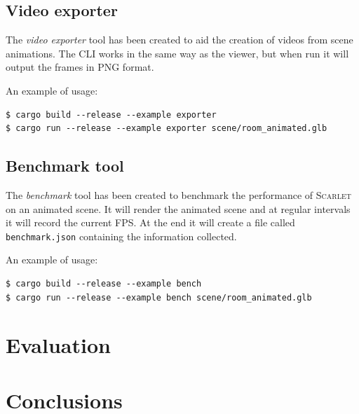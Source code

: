 \documentclass[11pt,a4paper]{report}
\begin{document}
\section{Video exporter}
The \textit{video exporter} tool has been created to aid the creation of videos from scene animations. The CLI works in the same way as the viewer, but when run it will output the frames in PNG format.

An example of usage:
\begin{verbatim}
$ cargo build --release --example exporter
$ cargo run --release --example exporter scene/room_animated.glb
\end{verbatim}

\section{Benchmark tool}
The \textit{benchmark} tool has been created to benchmark the performance of \textsc{Scarlet} on an animated scene. It will render the animated scene and at regular intervals it will record the current FPS. At the end it will create a file called \texttt{benchmark.json} containing the information collected.

An example of usage:
\begin{verbatim}
$ cargo build --release --example bench
$ cargo run --release --example bench scene/room_animated.glb
\end{verbatim}

\chapter{Evaluation}

\chapter{Conclusions}
\end{document}
